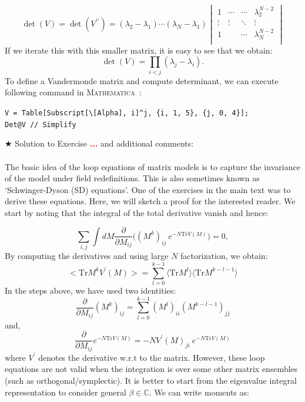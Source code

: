 \documentclass[11pt]{article}
\newcommand{\TODO}[1]{\textcolor{red}{{\bf #1}}}
\newcommand{\MA}{\textsc{Mathematica}}
\begin{document}
\begin{equation}
	\det(V) = \det(V^{\prime\prime}) = 
	(\lambda_2 - \lambda_1) \cdots (\lambda_N - \lambda_1)
	\begin{vmatrix}
		1 & \cdots & \cdots & \lambda_2^{N-2} \\ 
		\vdots  & \vdots  & \ddots & \vdots  \\
		1 &  & \cdots &  \lambda_N^{N-2} \\
	\end{vmatrix}
\end{equation}
If we iterate this with this smaller matrix, it is easy to see that we obtain:
\begin{equation}
	\det(V) = \prod_{i<j} (\lambda_j - \lambda_i).
\end{equation}
To define a Vandermonde matrix and compute determinant, we can execute following command in \MA~:
\begin{mdframed}[backgroundcolor=magenta!2]
	\begin{footnotesize} 
		\verb"V = Table[Subscript[\[Alpha], i]^j, {i, 1, 5}, {j, 0, 4}];"\\ 
		\verb"Det@V // Simplify"
	\end{footnotesize} 
\end{mdframed}


\noindent $\bigstar$ Solution to Exercise \TODO{...} and additional comments: 
\\ \\ 
The basic idea of the loop equations of matrix models is to capture the invariance of the model under field redefinitions. This is also sometimes known as `Schwinger-Dyson (SD) equations'. One of the exercises in the main text was to derive these equations. Here, we will sketch a proof for the interested reader. We start by noting that the integral of the total derivative vanish and hence:

\begin{equation}
	\sum_{i,j} \int dM \frac{\partial}{\partial M_{ij}} \Bigg( (M^k)_{ij}~e^{-N\mathrm{Tr} V(M)}\Bigg) = 0, 
\end{equation}
By computing the derivatives and using large $N$ factorization, we obtain:
\begin{equation}
	\Big< \mathrm{Tr} M^{k} V^{\prime}(M) \Big> = \sum_{l=0}^{k-1} \langle \mathrm{Tr} M^{l} \rangle  \langle \mathrm{Tr} M^{k-l-1} \rangle
\end{equation}
In the steps above, we have used two identities:
\begin{equation}
	\frac{\partial}{\partial M_{ij}} (M^{k})_{ij} = \sum_{l=0}^{k-1} (M^{l})_{ii} (M^{k-l-1})_{jj}
\end{equation}
and, 
\begin{equation}
	\frac{\partial}{\partial M_{ij}} e^{-N\mathrm{Tr} V(M)} = -N V^{\prime}(M)_{ji}~e^{-N\mathrm{Tr} V(M)}
\end{equation}
where $V^{\prime}$ denotes the derivative w.r.t to the matrix. 
However, these loop equations are not valid when the integration is over some other matrix ensembles (such as orthogonal/symplectic). It is better to start from the eigenvalue integral representation to consider general $\beta \in \mathbb{C}$. We can write moments as:
\end{document}
